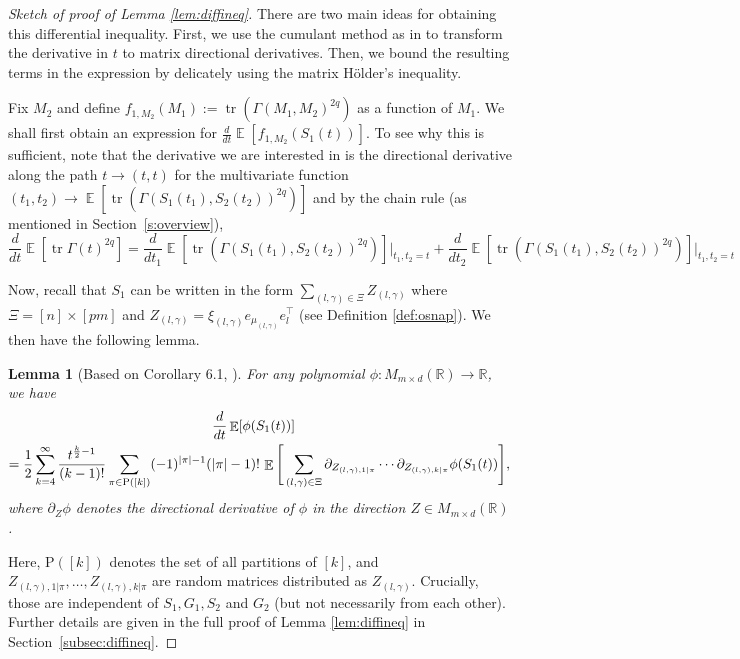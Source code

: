 \documentclass[11pt]{amsart}
\numberwithin{equation}{section}
\numberwithin{equation}{section}
\DeclareMathOperator{\E}{\mathbb{E}}
\DeclareMathOperator*{\tr}{tr}
\def \etc {,\ldots,}
\newtheorem*{lemmanon}{Lemma}
\theoremstyle{remark}
\theoremstyle{definition}
\begin{document}
\begin{proof}[Sketch of proof of Lemma \ref{lem:diffineq}]
    There are two main ideas for obtaining this differential inequality. First, we use the cumulant method as in \cite{brailovskaya2022universality} to transform the derivative in $t$ to matrix directional derivatives. Then, we bound the resulting terms in the expression by delicately using the matrix H\"older's inequality. 
    
    Fix $M_2$ and define $f_{1,M_2}(M_1):=\tr(\Gamma(M_1,M_2)^{2q})$ as a function of $M_1$. We shall first obtain an expression for $\frac{d}{dt}\E[f_{1,M_2}(S_1(t))]$. To see why this is sufficient, note that the derivative we are interested in is the directional derivative along the path $t \to (t,t)$ for the multivariate function $(t_1, t_2) \to \E [\tr(\Gamma(S_1(t_1), S_2(t_2))^{2q})]$ and by the chain rule (as mentioned in Section~\ref{s:overview}),
    \[ \frac{d}{dt} \E[\tr \Gamma(t)^{2q}] = \frac{d}{dt_1}\E [\tr(\Gamma(S_1(t_1), S_2(t_2))^{2q})] \bigg\vert_{t_1, t_2 = t} + \frac{d}{dt_2}\E [\tr(\Gamma(S_1(t_1), S_2(t_2))^{2q})] \bigg\vert_{t_1, t_2 = t}  \]
    
    
    Now, recall that $S_1$ can be written in the form $\sum_{(l,\gamma) \in \Xi} Z_{(l,\gamma)}$ where $\Xi=[n] \times [pm]$ and $Z_{(l,\gamma)}=\xi_{(l,\gamma)} e_{\mu_{(l, \gamma)}} e_l ^\top$ (see Definition \ref{def:osnap}). We then have the following lemma.
    \begin{lemmanon}[Based on Corollary 6.1, \cite{brailovskaya2022universality}] 
    For any polynomial $\phi:M_{m\times d}(\mathbb{R})\to\mathbb{R}$, we have
\begin{multline*}
\hspace{-3mm}\frac{d}{dt}\E[\phi(S_1(t))] \\
= \frac{1}{2}\sum_{k=4}^\infty
	\frac{t^{\frac{k}{2}-1}}{(k-1)!}
	\sum_{\pi\in\mathrm{P}([k])}
	(-1)^{|\pi|-1}(|\pi|-1)!\,
	\E\Bigg[ \sum_{(l,\gamma) \in \Xi}\partial_{Z_{(l,\gamma),1|\pi}}\cdots\partial_{Z_{(l,\gamma),k|\pi}}\phi(S_1(t))
	\Bigg],
\end{multline*}
where $\partial_Z\phi$ denotes the directional derivative of
$\phi$ in the direction $Z\in M_{m\times d}(\mathbb{R})$.
\end{lemmanon}
Here, $\mathrm{P}([k])$ denotes the set of all partitions of $[k]$, and $Z_{(l,\gamma),1|\pi} \etc Z_{(l,\gamma),k|\pi}$ are random matrices distributed as $Z_{(l,\gamma)}$. Crucially, those are independent of $S_1, G_1, S_2$ and $G_2$ (but not necessarily from each other). Further details are given in the full proof of Lemma \ref{lem:diffineq} in Section~\ref{subsec:diffineq}.


\end{proof}
\end{document}
